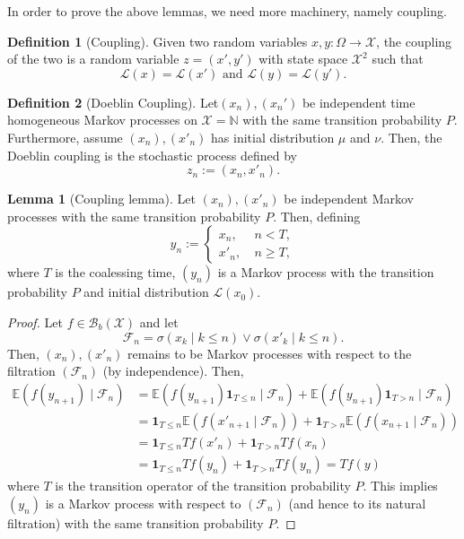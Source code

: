 \documentclass[]{article}
\theoremstyle{definition}
\theoremstyle{definition}
\newtheorem{definition}{Definition}[section]
\newtheorem{lemma}{Lemma}[section]
\begin{document}
In order to prove the above lemmas, we need more machinery, namely coupling.

\begin{definition}[Coupling]
  Given two random variables \(x, y : \Omega \to \mathcal{X}\), the coupling 
  of the two is a random variable \(z = (x', y')\) with state space \(\mathcal{X}^2\) 
  such that 
  \[\mathcal{L}(x) = \mathcal{L}(x') \text{ and } \mathcal{L}(y) = \mathcal{L}(y').\]
\end{definition}

\begin{definition}[Doeblin Coupling]
  Let\((x_n), (x_n')\) be independent time homogeneous Markov processes
  on \(\mathcal{X} = \mathbb{N}\) with the same transition probability \(P\). 
  Furthermore, assume \((x_n), (x'_n)\) has initial distribution \(\mu\) and \(\nu\).
  Then, the Doeblin coupling is the stochastic process defined by 
  \[z_n := (x_n, x'_n).\]
\end{definition}

\begin{lemma}[Coupling lemma]
  Let \((x_n), (x'_n)\) be independent Markov processes with the same 
  transition probability \(P\). Then, defining 
  \[y_n := \begin{cases}
    x_n, & \ n < T,\\
    x'_n, & \ n \ge T,
  \end{cases}\]
  where \(T\) is the coalessing time, \((y_n)\) is a Markov process with 
  the transition probability \(P\) and initial distribution \(\mathcal{L}(x_0)\).
\end{lemma}
\begin{proof}
  Let \(f \in \mathcal{B}_b(\mathcal{X})\) and let 
  \[\mathcal{F}_n = \sigma(x_k \mid k \le n) \vee \sigma(x'_k \mid k \le n).\]
  Then, \((x_n), (x'_n)\) remains to be Markov processes with respect to the 
  filtration \((\mathcal{F}_n)\) (by independence). Then, 
  \[\begin{split}
    \mathbb{E}(f(y_{n + 1}) \mid \mathcal{F}_n) & = 
    \mathbb{E}(f(y_{n + 1})\mathbf{1}_{T \le n} \mid \mathcal{F}_n) + 
    \mathbb{E}(f(y_{n + 1})\mathbf{1}_{T > n} \mid \mathcal{F}_n)\\
    & = 
    \mathbf{1}_{T \le n}\mathbb{E}(f(x'_{n + 1} \mid \mathcal{F}_n)) + 
    \mathbf{1}_{T > n}\mathbb{E}(f(x_{n + 1} \mid \mathcal{F}_n))\\
    & = \mathbf{1}_{T \le n} Tf(x'_n) + \mathbf{1}_{T > n} Tf(x_n)\\
    & = \mathbf{1}_{T \le n} Tf(y_n) + \mathbf{1}_{T > n} Tf(y_n) 
    = Tf(y)
  \end{split}\]
  where \(T\) is the transition operator of the transition probability 
  \(P\). This implies \((y_n)\) is a Markov 
  process with respect to \((\mathcal{F}_n)\) (and hence to its natural 
  filtration) with the same transition probability \(P\).
\end{proof}
\end{document}
